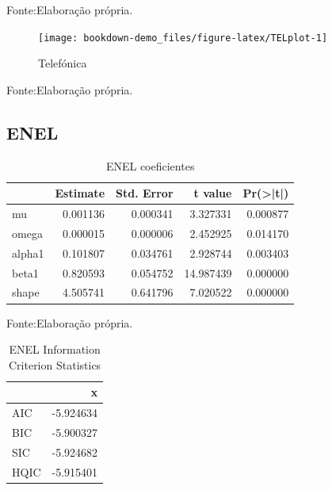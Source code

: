 \documentclass[
  12pt,
  a4paper,
  openany]{book}
\begin{document}
Fonte:Elaboração própria.

\justifying
\bigskip
\begin{figure}

{\centering \texttt{[image: bookdown-demo\_files/figure-latex/TELplot-1]} 

}

\caption{Telefónica}\label{fig:TELplot}
\end{figure}
\FloatBarrier
\centering

Fonte:Elaboração própria.

\justifying
\bigskip

\hypertarget{enel}{%
\subsection{ENEL}\label{enel}}

\begin{table}[!h]

\caption{\label{tab:unnamed-chunk-23}ENEL coeficientes}
\centering
\begin{tabular}[t]{lrrrr}
\toprule
  &  Estimate &  Std. Error &  t value & Pr(>|t|)\\
\midrule
mu & 0.001136 & 0.000341 & 3.327331 & 0.000877\\
omega & 0.000015 & 0.000006 & 2.452925 & 0.014170\\
alpha1 & 0.101807 & 0.034761 & 2.928744 & 0.003403\\
beta1 & 0.820593 & 0.054752 & 14.987439 & 0.000000\\
shape & 4.505741 & 0.641796 & 7.020522 & 0.000000\\
\bottomrule
\end{tabular}
\end{table}
\FloatBarrier
\centering

Fonte:Elaboração própria.

\justifying
\bigskip

\begin{table}[!h]

\caption{\label{tab:unnamed-chunk-24}ENEL Information Criterion Statistics}
\centering
\begin{tabular}[t]{lr}
\toprule
  & x\\
\midrule
AIC & -5.924634\\
BIC & -5.900327\\
SIC & -5.924682\\
HQIC & -5.915401\\
\bottomrule
\end{tabular}
\end{table}
\FloatBarrier
\centering
\end{document}
